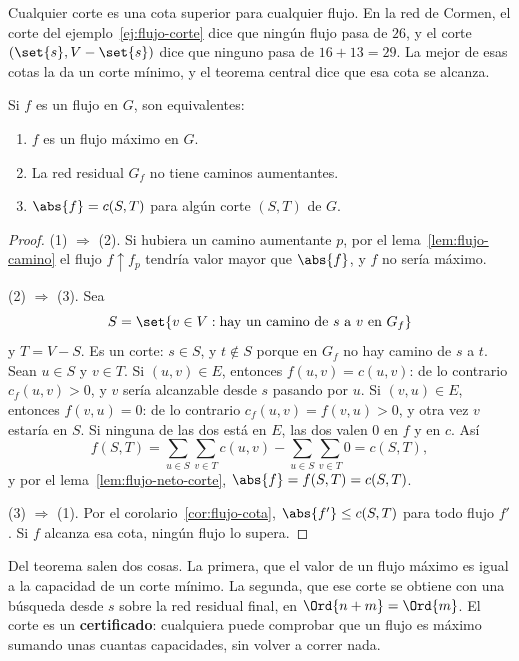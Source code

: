 \documentclass[11pt,letterpaper]{article}
\begin{document}
Cualquier corte es una cota superior para cualquier flujo. En la red
de Cormen, el corte del ejemplo~\ref{ej:flujo-corte} dice que ningún
flujo pasa de $26$, y el corte $(\set{s}, V - \set{s})$ dice que
ninguno pasa de $16 + 13 = 29$. La mejor de esas cotas la da un corte
mínimo, y el teorema central dice que esa cota se alcanza.

\begin{teorema}\label{teo:flujo-corte}
  Si $f$ es un flujo en $G$, son equivalentes:
  \begin{enumerate}
    \item $f$ es un flujo máximo en $G$.
    \item La red residual $G_f$ no tiene caminos aumentantes.
    \item $\abs{f} = c(S, T)$ para algún corte $(S, T)$ de $G$.
  \end{enumerate}
\end{teorema}

\begin{proof}
  (1) $\Rightarrow$ (2). Si hubiera un camino aumentante $p$, por el
  lema~\ref{lem:flujo-camino} el flujo $f \uparrow f_p$ tendría valor
  mayor que $\abs{f}$, y $f$ no sería máximo.

  (2) $\Rightarrow$ (3). Sea
  \[
    S = \set{v \in V : \text{hay un camino de } s \text{ a } v
             \text{ en } G_f}
  \]
  y $T = V - S$. Es un corte: $s \in S$, y $t \notin S$ porque en
  $G_f$ no hay camino de $s$ a $t$. Sean $u \in S$ y $v \in T$. Si
  $(u, v) \in E$, entonces $f(u, v) = c(u, v)$: de lo contrario
  $c_f(u, v) > 0$, y $v$ sería alcanzable desde $s$ pasando por $u$.
  Si $(v, u) \in E$, entonces $f(v, u) = 0$: de lo contrario
  $c_f(u, v) = f(v, u) > 0$, y otra vez $v$ estaría en $S$. Si ninguna
  de las dos está en $E$, las dos valen $0$ en $f$ y en $c$. Así
  \[
    f(S, T) = \sum_{u \in S} \sum_{v \in T} c(u, v)
            - \sum_{u \in S} \sum_{v \in T} 0 = c(S, T) ,
  \]
  y por el lema~\ref{lem:flujo-neto-corte}, $\abs{f} = f(S, T) =
  c(S, T)$.

  (3) $\Rightarrow$ (1). Por el corolario~\ref{cor:flujo-cota},
  $\abs{f'} \le c(S, T)$ para todo flujo $f'$. Si $f$ alcanza esa
  cota, ningún flujo lo supera.
\end{proof}

Del teorema salen dos cosas. La primera, que el valor de un flujo
máximo es igual a la capacidad de un corte mínimo. La segunda, que ese
corte se obtiene con una búsqueda desde $s$ sobre la red residual
final, en $\Ord{n + m} = \Ord{m}$. El corte es un
\textbf{certificado}: cualquiera puede comprobar que un flujo es
máximo sumando unas cuantas capacidades, sin volver a correr nada.
\end{document}
